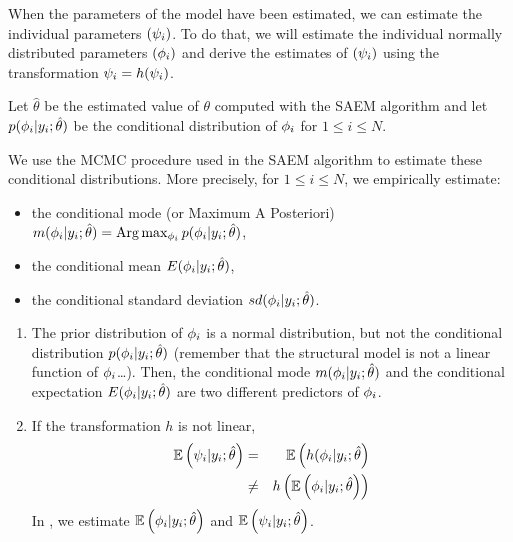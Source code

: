 When the parameters of the model have been estimated, we can estimate the individual parameters $({\psi_i})$. To do that, we will estimate the individual normally distributed parameters $({{\phi}_i})$ and derive the estimates of $({\psi_i})$ using the transformation ${\psi_i}= h({\psi_i})$.

Let $\hat{\theta}$ be the estimated value of $\theta$ computed with the SAEM algorithm and let $p({{\phi}_i}|y_i;\hat{\theta})$ be the conditional distribution of ${{\phi}_i}$ for $1\leq i \leq N$.

We use the MCMC procedure used in the SAEM algorithm to estimate these conditional distributions. More precisely, for $1\leq i \leq N$, we empirically estimate:

\begin{itemize}
  \item the conditional mode (or Maximum A Posteriori)
  $ m({{\phi}_i}|y_i;\hat{\theta})={\rm Arg}\max_{{\phi}_i} p({{\phi}_i}|y_i;\hat{\theta})$,
  \item the conditional mean
  $ E({{\phi}_i}|y_i;\hat{\theta})$,
  \item the conditional standard deviation
 $ sd({{\phi}_i}|y_i;\hat{\theta})$.
 \end{itemize}

 \begin{enumerate}
  \item The prior distribution of ${{\phi}_i}$ is a normal distribution, but not the conditional distribution $p({{\phi}_i}|y_i;\hat{\theta})$ (remember that the structural model is not a linear function of ${{\phi}_i}$\ldots). Then, the conditional mode $m({{\phi}_i}|y_i;\hat{\theta})$ and the conditional expectation $ E({{\phi}_i}|y_i;\hat{\theta})$ are two different predictors of ${{\phi}_i}$.
  \item If the transformation $h$ is not linear,
      \begin{eqnarray*}
       \mathbb{E}\left({\psi_i}|y_i;\hat{\theta}\right) &=&  \mathbb{E}\left(h({{\phi}_i}|y_i;\hat{\theta}\right) \\
       &\neq& h\left(\mathbb{E}\left({{\phi}_i}|y_i;\hat{\theta}\right)  \right)
       \end{eqnarray*}
       In \monolix, we estimate $\mathbb{E}\left({{\phi}_i}|y_i;\hat{\theta}\right)$ and $\mathbb{E}\left({\psi_i}|y_i;\hat{\theta}\right)$.
\end{enumerate}

